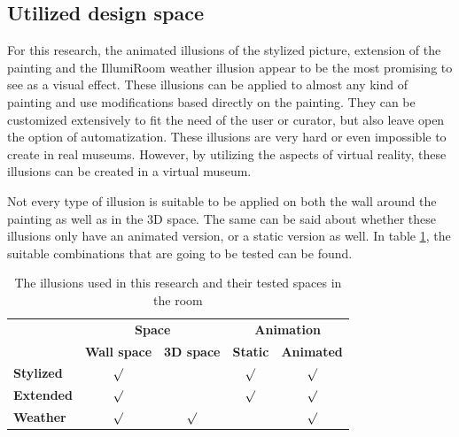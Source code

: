 \documentclass[a4paper]{article}
\begin{document}
\subsection{Utilized design space} 

For this research, the animated illusions of the stylized picture, extension of the painting and the IllumiRoom weather illusion appear to be the most promising to see as a visual effect. These illusions can be applied to almost any kind of painting and use modifications based directly on the painting. They can be customized extensively to fit the need of the user or curator, but also leave open the option of automatization. These illusions are very hard or even impossible to create in real museums. However, by utilizing the aspects of virtual reality, these illusions can be created in a virtual museum.

Not every type of illusion is suitable to be applied on both the wall around the painting as well as in the 3D space. The same can be said about whether these illusions only have an animated version, or a static version as well. In table \ref{tab:ourillusions}, the suitable combinations that are going to be tested can be found.

\begin{table}[]
\centering
\begin{tabular}{l|cc|cc|}
\cline{2-5}
\textbf{} & \multicolumn{2}{c|}{\textbf{Space}} & \multicolumn{2}{c|}{\textbf{Animation}} \\ \cline{2-5} 
\textbf{} & \textbf{Wall space} & \textbf{3D space} & \textbf{Static} & \textbf{Animated} \\ \hline
\multicolumn{1}{|l|}{\textbf{Stylized}} & $\surd$ &  & $\surd$ & $\surd$ \\ \cline{1-1}
\multicolumn{1}{|l|}{\textbf{Extended}} & $\surd$ &  & $\surd$ & $\surd$ \\ \cline{1-1}
\multicolumn{1}{|l|}{\textbf{Weather}} & $\surd$ & $\surd$ &  & $\surd$ \\ \hline
\end{tabular}
\caption{\label{tab:ourillusions}The illusions used in this research and their tested spaces in the room}
\end{table}
\end{document}
